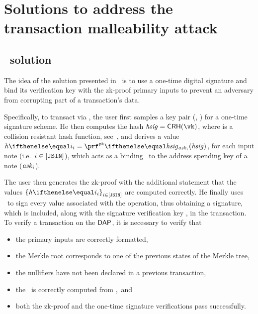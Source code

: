 \section{Solutions to address the transaction malleability attack}

\subsection{\zerocash~solution}\label{appendix:trnm:ssec:zerocash-trnm}
The idea of the solution presented in~\cite{sasson2014zerocash} is to use a one-time \sufcma{} digital signature and bind its verification key with the zk-proof primary inputs to prevent an adversary from corrupting part of a transaction's data.

Specifically, to transact via \zeth, the user first samples a key pair (\sk, \vk) for a one-time signature scheme. He then computes the hash $\hsig = \crh(\vk)$, where \crh{} is a collision resistant hash function, see~\cite{sasson2014zerocash}, and derives a value $\htag{i} = \prfpk{\ask_{i}}{\hsig}$, for each input note (i.e.~$i \in [\mathtt{JSIN}]$), which acts as a \mmac{} binding \hsig~to the address spending key of a note ($\mathit{ask}_{i}$).

The user then generates the zk-proof with the additional statement that the values $\indexedset{\htag{i}}{i \in [\jsin]}$ are computed correctly. He finally uses \sk~to sign every value associated with the operation, thus obtaining a signature, which is included, along with the signature verification key \vk, in the transaction.
To verify a transaction on the $\mathsf{DAP}$, it is necessary to verify that
\begin{itemize}
  \item the primary inputs are correctly formatted,
  \item the Merkle root corresponds to one of the previous states of the Merkle tree,
  \item the nullifiers have not been declared in a previous transaction,
  \item the \hsig~is correctly computed from \vk,~and
  \item both the zk-proof and the one-time signature verifications pass successfully.
\end{itemize}

